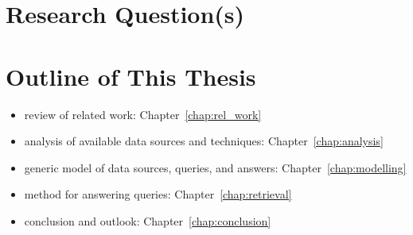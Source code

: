 \section{Research Question(s)}
\label{sec:research_questions}



\section{Outline of This Thesis}
\label{sec:outline}

\begin{itemize}
  \item
    review of related work: Chapter~\ref{chap:rel_work}
  \item
    analysis of available data sources and techniques: Chapter~\ref{chap:analysis}
  \item
    generic model of data sources, queries, and answers: Chapter~\ref{chap:modelling}
  \item
    method for answering queries: Chapter~\ref{chap:retrieval}
  \item
    conclusion and outlook: Chapter~\ref{chap:conclusion}
\end{itemize}



